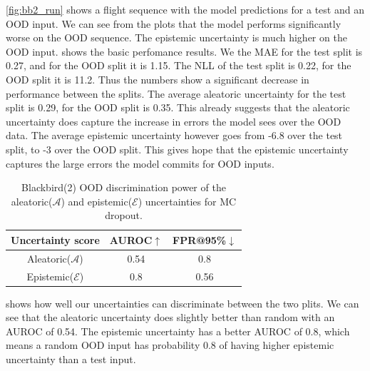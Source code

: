 \cref{fig:bb2_run} shows a flight sequence with the model predictions for a test and an OOD input. We can see from the plots that the model performs significantly worse on the OOD sequence. The epistemic uncertainty is much higher on the OOD input.  shows the basic perfomance results. We the MAE for the test split is 0.27, and for the OOD split it is 1.15. The NLL of the test split is 0.22, for the OOD split it is 11.2. Thus the numbers show a significant decrease in performance between the splits. The average aleatoric uncertainty for the test split is 0.29, for the OOD split is 0.35. This already suggests that the aleatoric uncertainty does capture the increase in errors the model sees over the OOD data. The average epistemic uncertainty however goes from -6.8 over the test split, to -3 over the OOD split. This gives hope that the epistemic uncertainty captures the large errors the model commits for OOD inputs. 

\begin{table}[h]
\centering
    \begin{tabular}{c  c  c}  
        \toprule
        Uncertainty score & AUROC$\uparrow$ & FPR@95\%$\downarrow$\\
        \midrule
        Aleatoric($\mathcal{A}$) & 0.54  & 0.8\\
        Epistemic($\mathcal{E}$) & 0.8 &  0.56 \\
        \midrule
    \end{tabular}
    \caption{Blackbird(2) OOD discrimination power of the aleatoric($\mathcal{A}$) and epistemic($\mathcal{E}$) uncertainties for MC dropout.}
    \label{tbl:bb2_discrimination}
\end{table}

 shows how well our uncertainties can discriminate between the two plits. We can see that the aleatoric uncertainty does slightly better than random with an AUROC of 0.54. The epistemic uncertainty has a better AUROC of 0.8, which means a random OOD input has probability 0.8 of having higher epistemic uncertainty than a test input. 

